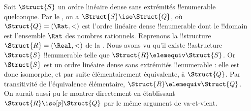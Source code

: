 \documentclass[../../../include/open-logic-section]{subfiles}
\begin{document}
\begin{rem}
  Soit $\Struct{S}$ un ordre linéaire dense sans
  extrémités !!{enumerable} quelconque. Par le
  , on a $\Struct{S} \iso
  \Struct{Q}$, où $\Struct{Q} = (\Rat, <)$
  est l'ordre linéaire dense !!{enumerable} dont le
  !!{domain} est l'ensemble $\Rat$ des nombres rationnels.
  Reprenons la !!{structure}~$\Struct{R} =
  (\Real, <)$ de la . Nous avons
  vu qu'il existe !!a{structure}~$\Struct{S}$
  !!{enumerable} telle que $\Struct{R} \elemequiv
  \Struct{S}$. Or $\Struct{S}$ est un ordre linéaire
  dense sans extrémités !!{enumerable} : elle est donc
  isomorphe, et par suite élémentairement équivalente,
  à $\Struct{Q}$. Par transitivité de l'équivalence
  élémentaire, $\Struct{R} \elemequiv
  \Struct{Q}$. On aurait aussi pu le montrer
  directement en établissant $\Struct{R}
  \iso[p] \Struct{Q}$ par le même argument
  de va-et-vient.
\end{rem}
\end{document}
